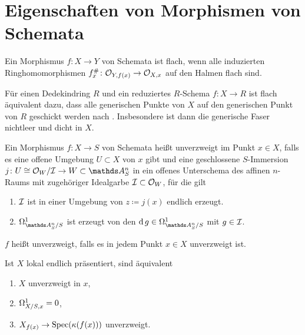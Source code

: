 \documentclass[german]{scrreprt}
\begin{document}
\section{Eigenschaften von Morphismen von Schemata}
\begin{Definition}
  Ein Morphismus $f\colon X\to Y$ von Schemata ist flach, wenn alle
  induzierten Ringhomomorphismen $f_x^\#\colon \mathcal{O}_{Y,f(x)}\to\mathcal{O}_{X,x}$  auf
  den Halmen flach sind.
\end{Definition}
\begin{Bemerkung}\label{thm:flachgenerischefaser}
  Für einen Dedekindring $R$ und ein reduziertes $R$-Schema $f\colon
  X\to R$ ist flach äquivalent dazu, dass alle generischen Punkte von 
  $X$ auf den generischen Punkt von $R$ geschickt werden
  nach \cite[Proposition III.9.7]{hartshorne}.
  Insbesondere ist dann die generische Faser nichtleer und dicht in $X$.
\end{Bemerkung}

\begin{Definition}
  Ein Morphismus $f\colon X\to S$ von Schemata heißt unverzweigt im
  Punkt $x\in X$, falls es eine offene Umgebung
  $U\subset X$ von $x$ gibt und eine geschlossene $S$-Immersion
  $j\colon U\cong\O_W/\I\to W\subset\A_S^n$ in ein offenes Unterschema
  des affinen $n$-Raums mit zugehöriger Idealgarbe $\mathcal{I}\subset\mathcal{O}_W$,
  für die gilt
  \begin{enumerate}[label=(\alph*)]
  \item $\mathcal{I}$ ist in einer Umgebung von $z\coloneqq j(x)$ endlich erzeugt.
  \item $\Om{\A_S^n/S}$ ist erzeugt von den $\d g\in\Om{\A_S^n/S}$
    mit $g\in\mathcal{I}$.
  \end{enumerate}
  $f$ heißt unverzweigt, falls es in jedem Punkt $x\in X$
  unverzweigt ist.
  \begin{Bemerkung}
    Ist $X$ lokal endlich präsentiert, sind äquivalent
    \begin{enumerate}[label=(\roman*)]
    \item $X$ unverzweigt in $x$,
    \item $\Omega_{X/S,x}^1=0$,
    \item $X_{f(x)}\to \operatorname{Spec}(\kappa(f(x)))$ unverzweigt.
    \end{enumerate}
  \end{Bemerkung}
\end{Definition}
\end{document}
